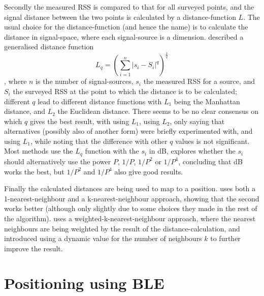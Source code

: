 Secondly the measured RSS is compared to that for all surveyed points, and the signal distance between the two points is calculated by a distance-function $L$.
The usual choice for the distance-function (and hence the name) is to calculate the distance in signal-space, where each signal-source is a dimension.
\citet{li2005method} described a generalised distance function
\begin{equation}
    L_q = \left(\sum_{i=1}^{n}|s_i-S_i|^q\right)^{\frac{1}{q}}
    \label{eq:architecture-distance}
\end{equation}
, where $n$ is the number of signal-sources, $s_i$ the measured RSS for a source, and $S_i$ the surveyed RSS at the point to which the distance is to be calculated; different $q$ lead to different distance functions with $L_1$ being the Manhattan distance, and $L_2$ the Euclidean distance.
There seems to be no clear consensus on which $q$ gives the best result, with \citet{shin2012enhanced} using $L_1$, \citet{bahl2000radar} using $L_2$, only saying that alternatives (possibly also of another form) were briefly experimented with, and \citet{li2005method} using $L_1$, while noting that the difference with other $q$ values is not significant.
Most methods use the $L_q$ function with the $s_i$ in dB, \citet{li2005method} explores whether the $s_i$ should alternatively use the power $P$, $1/P$, $1/P^2$ or $1/P^4$, concluding that dB works the best, but $1/P^2$ and $1/P^4$ also give good results.

Finally the calculated distances are being used to map to a position.
\citet{bahl2000radar} uses both a 1-nearest-neighbour and a k-nearest-neighbour approach, showing that the second works better (although only slightly due to some choices they made in the rest of the algorithm).
\citet{li2005method} uses a weighted-k-nearest-neighbour approach, where the nearest neighbours are being weighted by the result of the distance-calculation, and \citet{shin2012enhanced} introduced using a dynamic value for the number of neighbours $k$ to further improve the result.

\section{Positioning using BLE}

